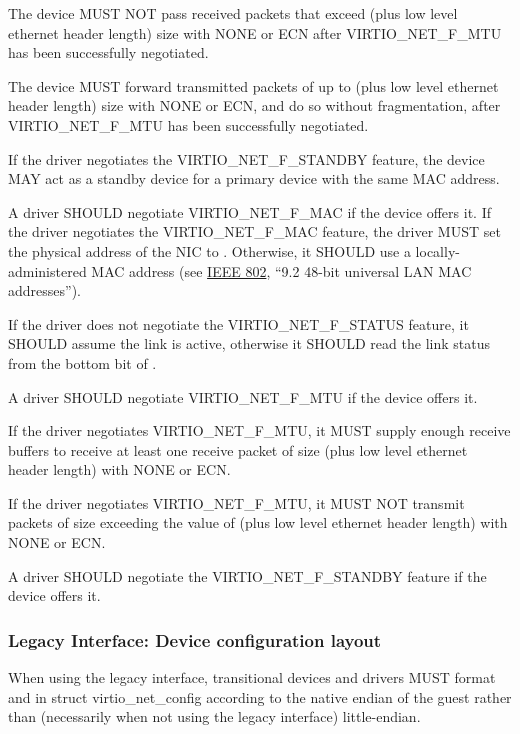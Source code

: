 The device MUST NOT pass received packets that exceed  (plus low
level ethernet header length) size with  NONE or ECN
after VIRTIO_NET_F_MTU has been successfully negotiated.

The device MUST forward transmitted packets of up to  (plus low
level ethernet header length) size with  NONE or ECN, and do
so without fragmentation, after VIRTIO_NET_F_MTU has been successfully
negotiated.

If the driver negotiates the VIRTIO_NET_F_STANDBY feature, the device MAY act
as a standby device for a primary device with the same MAC address.


A driver SHOULD negotiate VIRTIO_NET_F_MAC if the device offers it.
If the driver negotiates the VIRTIO_NET_F_MAC feature, the driver MUST set
the physical address of the NIC to .  Otherwise, it SHOULD
use a locally-administered MAC address (see \hyperref[intro:IEEE 802]{IEEE 802},
``9.2 48-bit universal LAN MAC addresses'').

If the driver does not negotiate the VIRTIO_NET_F_STATUS feature, it SHOULD
assume the link is active, otherwise it SHOULD read the link status from
the bottom bit of .

A driver SHOULD negotiate VIRTIO_NET_F_MTU if the device offers it.

If the driver negotiates VIRTIO_NET_F_MTU, it MUST supply enough receive
buffers to receive at least one receive packet of size  (plus low
level ethernet header length) with  NONE or ECN.

If the driver negotiates VIRTIO_NET_F_MTU, it MUST NOT transmit packets of
size exceeding the value of  (plus low level ethernet header length)
with  NONE or ECN.

A driver SHOULD negotiate the VIRTIO_NET_F_STANDBY feature if the device offers it.

\subsubsection{Legacy Interface: Device configuration layout}\label{sec:Device Types / Network Device / Device configuration layout / Legacy Interface: Device configuration layout}
\label{sec:Device Types / Block Device / Feature bits / Device configuration layout / Legacy Interface: Device configuration layout}
When using the legacy interface, transitional devices and drivers
MUST format  and
 in struct virtio_net_config
according to the native endian of the guest rather than
(necessarily when not using the legacy interface) little-endian.


